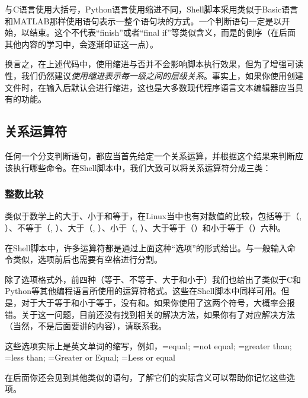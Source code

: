 \begin{extend}
    与C语言使用大括号，Python语言使用缩进不同，Shell脚本采用类似于Basic语言和MATLAB那样使用语句表示一整个语句块的方式。一个判断语句一定是以开始，以结束。这个不代表“finish”或者“final if”等类似含义，而是的倒序（在后面其他内容的学习中，会逐渐印证这一点）。

    换言之，在上述代码中，使用缩进与否并不会影响脚本执行效果，但为了增强可读性，我们仍然建议\emph{使用缩进表示每一级之间的层级关系}。事实上，如果你使用创建文件时，在输入后默认会进行缩进，这也是大多数现代程序语言文本编辑器应当具有的功能。
\end{extend}

\subsection{关系运算符}\label{subsec:判断语句-关系运算符}

任何一个分支判断语句，都应当首先给定一个关系运算，并根据这个结果来判断应该执行哪些命令。在Shell脚本中，我们大致可以将关系运算符分成三类：

\subsubsection{整数比较}

类似于数学上的大于、小于和等于，在Linux当中也有对数值的比较，包括等于（, \code{==}）、不等于（, \code{!=}）、大于（, \code{>}）、小于（, \code{<}）、大于等于（）和小于等于（）六种。

\begin{attention}
    在Shell脚本中，许多运算符都是通过上面这种“选项”的形式给出。与一般输入命令类似，选项前后也需要有空格进行分割。

    除了选项格式外，前四种（等于、不等于、大于和小于）我们也给出了类似于C和Python等其他编程语言所使用的运算符格式。这些在Shell脚本中同样可用。但是，对于大于等于和小于等于，没有\code{>=}和\code{<=}。如果你使用了这两个符号，大概率会报错。关于这一问题，目前还没有找到相关的解决方法，如果你有了对应解决方法（当然，不是后面要讲的内容），请联系我。
\end{attention}

\begin{extend}
    这些选项实际上是英文单词的缩写，例如，=equal; =not equal; =greater than; =less than; =Greater or Equal; =Less or equal

    在后面你还会见到其他类似的语句，了解它们的实际含义可以帮助你记忆这些选项。
\end{extend}

